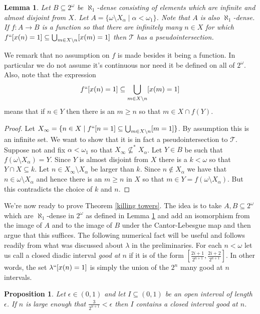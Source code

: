 \documentclass[leqno,11pt]{amsart}
\newtheorem{lemma}[theorem]{Lemma}
\newtheorem{proposition}[theorem]{Proposition}
\theoremstyle{definition}
\theoremstyle{remark}
\def\cantor{2^\omega}
\begin{document}
\begin{lemma}
Let $B \subseteq 2^\omega$ be $\aleph_1$-dense consisting of elements which are infinite and almost disjoint from $X$. Let $A = \{\omega \setminus X_\alpha\mid \alpha < \omega_1\}$. Note that $A$ is also $\aleph_1$-dense. If $f:A \to B$ is a function so that there are infinitely many $n \in X$ for which $f``[x(n) =1] \subseteq \bigcup_{m \in X \setminus n} [x(m)=1]$ then $\mathcal T$ has a pseudointersection. \label{little}
\end{lemma}

We remark that no assumption on $f$ is made besides it being a function. In particular we do not assume it's continuous nor need it be defined on all of $\cantor$. Also, note that the expression $$f``[x(n) =1] \subseteq \bigcup_{m \in X \setminus n} [x(m)=1]$$ means that if $n \in Y$ then there is an $m \geq n$ so that $m \in X \cap f(Y)$. 

\begin{proof}
Let $X_\infty = \{n \in X \; | \; f``[n =1] \subseteq \bigcup_{m \in X \setminus n} [m=1]\}$. By assumption this is an infinite set. We want to show that it is in fact a pseudointersection to $\mathcal T$. Suppose not and fix $\alpha < \omega_1$ so that $X_\infty \nsubseteq^* X_\alpha$. Let $Y \in B$ be such that $f(\omega \setminus X_\alpha) = Y$. Since $Y$ is almost disjoint from $X$ there is a $k < \omega$ so that $Y \cap X \subseteq k$. Let $n \in X_\infty \setminus X_\alpha$ be larger than $k$. Since $n \notin X_\alpha$ we have that $n \in \omega \setminus X_\alpha$ and hence there is an $m\geq n$ in $X$ so that $m \in Y =  f(\omega\setminus X_\alpha)$. But this contradicts the choice of $k$ and $n$. 

\end{proof}


We're now ready to prove Theorem \ref{killing towers}. The idea is to take $A, B \subseteq 2^\omega$ which are $\aleph_1$-dense in $2^\omega$ as defined in Lemma \ref{little} and add an isomorphism from the image of $A$ and to the image of $B$ under the Cantor-Lebesgue map and then argue that this suffices. The following numerical fact will be useful and follows readily from what was discussed about $\lambda$ in the preliminaries. For each $n < \omega$ let us call a closed diadic interval {\em good at} $n$ if it is of the form $[\frac{2i+1}{2^{n+1}}, \frac{2i + 2}{2^{n+1}}]$. In other words, the set $\lambda``[x(n) = 1]$ is simply the union of the $2^{n}$ many good at $n$ intervals. 

\begin{proposition}
    Let $\epsilon \in (0, 1)$ and let $I \subseteq (0, 1)$ be an open interval of length $\epsilon$. If $n$ is large enough that $\frac{3}{2^{n+1}} < \epsilon$ then $I$ contains a closed interval good at $n$. \label{numbers}
\end{proposition}
\end{document}
